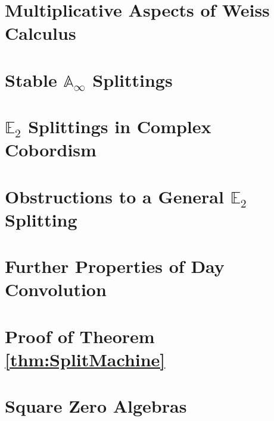 \documentclass[reqno, oneside]{amsart}
\theoremstyle{definition}
\theoremstyle{plain}
\begin{document}
\section{Multiplicative Aspects of Weiss Calculus} \label{sec:MultWeiss}



\section{Stable \texorpdfstring{$\mathbb{A}_\infty$}{Aoo} Splittings} \label{sec:AooSplit}



\section{\texorpdfstring{$\mathbb{E}_2$}{E2} Splittings in Complex Cobordism} \label{sec:MUE2}



\section{Obstructions to a General \texorpdfstring{$\mathbb{E}_2$}{E2} Splitting} \label{sec:Obstruction}



\appendix

\section{Further Properties of Day Convolution}\label{app:day}



\section{Proof of Theorem \ref{thm:SplitMachine}}\label{app:SplittingMachine}



\section{Square Zero Algebras}


\end{document}
